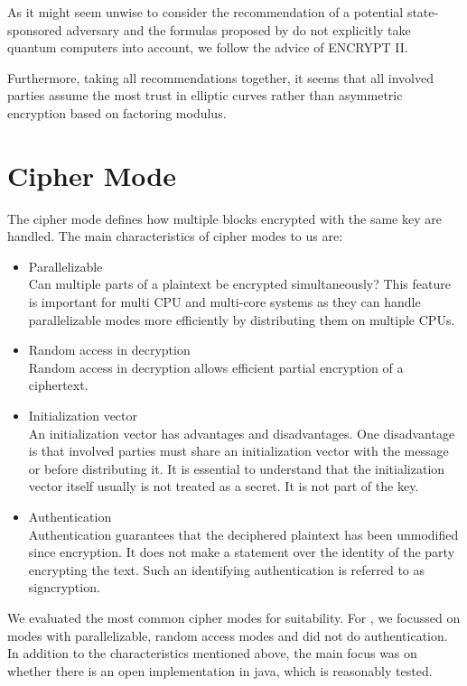 As it might seem unwise to consider the recommendation of a potential state-sponsored adversary and the formulas proposed by \citeauthor{Lenstra04keylength.} do not explicitly take quantum computers into account, we follow the advice of ENCRYPT II.

Furthermore, taking all recommendations together, it seems that all involved parties assume the most trust in elliptic curves rather than asymmetric encryption based on factoring modulus.

\section{Cipher Mode}
The cipher mode defines how multiple blocks encrypted with the same key are handled. The main characteristics of cipher modes to us are:
\begin{itemize}
	\item Parallelizable\\ 
	Can multiple parts of a plaintext be encrypted simultaneously? This feature is important for multi CPU and multi-core systems as they can handle parallelizable modes more efficiently by distributing them on multiple CPUs.
	\item Random access in decryption\\
	Random access in decryption allows efficient partial encryption of a ciphertext.
	\item Initialization vector\\
	An initialization vector has advantages and disadvantages. One disadvantage is that involved parties must share an initialization vector with the message or before distributing it. It is essential to understand that the initialization vector itself usually is not treated as a secret. It is not part of the key.
	\item Authentication\\
	Authentication guarantees that the deciphered plaintext has been unmodified since encryption. It does not make a statement over the identity of the party encrypting the text. Such an identifying authentication is referred to as signcryption.
\end{itemize}

We evaluated the most common cipher modes for suitability. For \MessageVortex, we focussed on modes with parallelizable, random access modes and did not do authentication. In addition to the characteristics mentioned above, the main focus was on whether there is an open implementation in java, which is reasonably tested.

